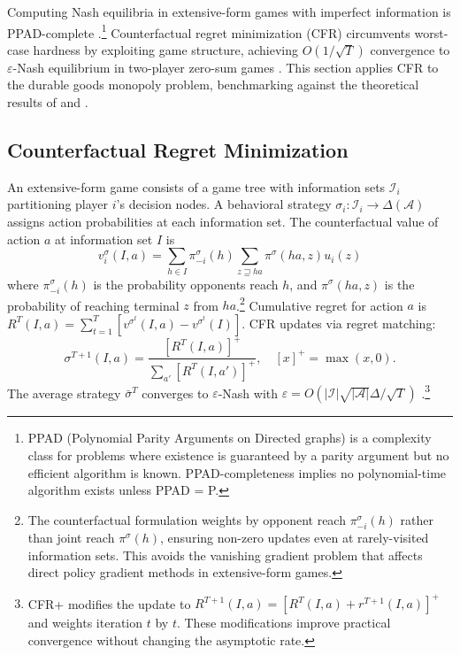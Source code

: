 
Computing Nash equilibria in extensive-form games with imperfect information is PPAD-complete \citep{Daskalakis2009}.\footnote{PPAD (Polynomial Parity Arguments on Directed graphs) is a complexity class for problems where existence is guaranteed by a parity argument but no efficient algorithm is known. PPAD-completeness implies no polynomial-time algorithm exists unless PPAD = P.} Counterfactual regret minimization (CFR) circumvents worst-case hardness by exploiting game structure, achieving $O(1/\sqrt{T})$ convergence to $\varepsilon$-Nash equilibrium in two-player zero-sum games \citep{zinkevich2008}. This section applies CFR to the durable goods monopoly problem, benchmarking against the theoretical results of \citet{gul1986foundations} and \citet{ausubel1989reputation}.

\subsection{Counterfactual Regret Minimization}

An extensive-form game consists of a game tree with information sets $\mathcal{I}_i$ partitioning player $i$'s decision nodes. A behavioral strategy $\sigma_i: \mathcal{I}_i \to \Delta(\mathcal{A})$ assigns action probabilities at each information set. The counterfactual value of action $a$ at information set $I$ is
\begin{equation}
v^\sigma_i(I, a) = \sum_{h \in I} \pi^\sigma_{-i}(h) \sum_{z \sqsupseteq ha} \pi^\sigma(ha, z) u_i(z)
\end{equation}
where $\pi^\sigma_{-i}(h)$ is the probability opponents reach $h$, and $\pi^\sigma(ha, z)$ is the probability of reaching terminal $z$ from $ha$.\footnote{The counterfactual formulation weights by opponent reach $\pi^\sigma_{-i}(h)$ rather than joint reach $\pi^\sigma(h)$, ensuring non-zero updates even at rarely-visited information sets. This avoids the vanishing gradient problem that affects direct policy gradient methods in extensive-form games.} Cumulative regret for action $a$ is $R^T(I,a) = \sum_{t=1}^T [v^{\sigma^t}(I,a) - v^{\sigma^t}(I)]$. CFR updates via regret matching:
\begin{equation}
\sigma^{T+1}(I, a) = \frac{[R^T(I, a)]^+}{\sum_{a'} [R^T(I, a')]^+}, \quad [x]^+ = \max(x,0).
\end{equation}
The average strategy $\bar{\sigma}^T$ converges to $\varepsilon$-Nash with $\varepsilon = O(|\mathcal{I}|\sqrt{|\mathcal{A}|}\Delta / \sqrt{T})$ \citep{zinkevich2008}.\footnote{CFR+ \citep{tammelin2014solving} modifies the update to $R^{T+1}(I, a) = [R^T(I, a) + r^{T+1}(I, a)]^+$ and weights iteration $t$ by $t$. These modifications improve practical convergence without changing the asymptotic rate.}

